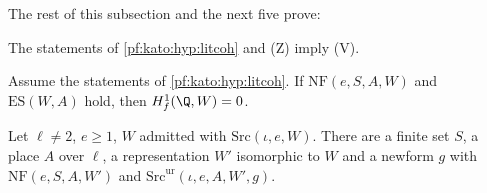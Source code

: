 The rest of this subsection and the next five prove:

\begin{theorem}\label{pf:kato:vanishordl}
The statements of \cref{pf:kato:hyp:litcoh} and \textup{(Z)} imply \textup{(V)}.
\end{theorem}

\begin{theorem}\label{pf:kato:esvanish}
Assume the statements of \cref{pf:kato:hyp:litcoh}. If $\mathrm{NF}(e,S,A,W)$ and $\mathrm{ES}(W,A)$ hold, then
$\katoHf(\Q,W)=0$.
\end{theorem}

\begin{lemma}\label{pf:kato:nf}
Let $\ell\ne2$, $e\ge1$, $W$ admitted with $\mathrm{Src}(\iota,e,W)$. There are a finite set $S$, a place $A$ over
$\ell$, a representation $W'$ isomorphic to $W$ and a newform $g$ with $\mathrm{NF}(e,S,A,W')$ and
$\mathrm{Src}^{\mathrm{ur}}(\iota,e,A,W',g)$.
\end{lemma}

